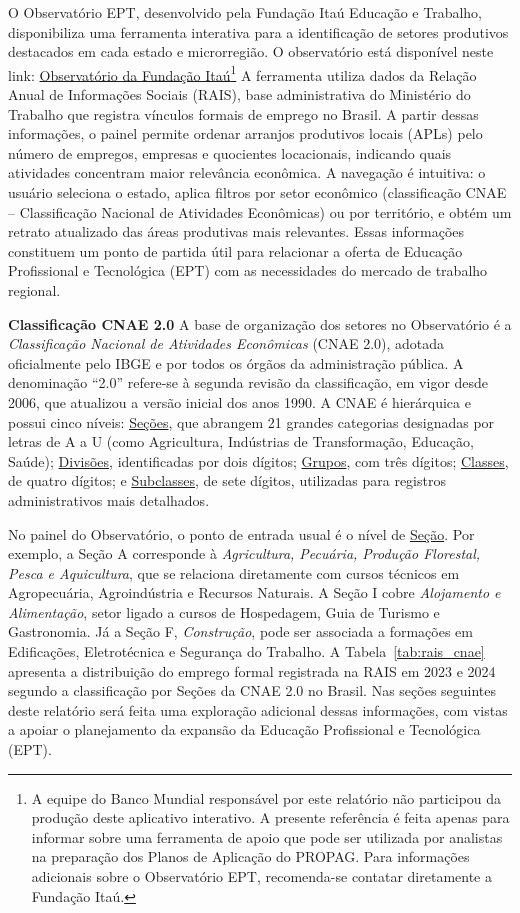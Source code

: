 O Observatório EPT, desenvolvido pela Fundação Itaú Educação e Trabalho, 
disponibiliza uma ferramenta interativa para a identificação de setores produtivos 
destacados em cada estado e microrregião. O observatório está disponível neste link:  
\href{https://observatorioitau.org.br/}{Observatório da Fundação Itaú}\footnote{A equipe do Banco Mundial responsável por este relatório não participou da produção 	deste aplicativo interativo. A presente referência é feita apenas para informar sobre 	uma ferramenta de apoio que pode ser utilizada por analistas na preparação dos 	Planos de Aplicação do PROPAG. Para informações adicionais sobre o Observatório EPT, 
recomenda-se contatar diretamente a Fundação Itaú.} A ferramenta utiliza dados da Relação Anual de Informações Sociais (RAIS), base  administrativa do Ministério do Trabalho que registra vínculos formais de emprego 
no Brasil. A partir dessas informações, o painel permite ordenar arranjos produtivos 
locais (APLs) pelo número de empregos, empresas e quocientes locacionais, 
indicando quais atividades concentram maior relevância econômica. A navegação é 
intuitiva: o usuário seleciona o estado, aplica filtros por setor econômico 
(classificação CNAE -- Classificação Nacional de Atividades Econômicas) ou por 
território, e obtém um retrato atualizado das áreas produtivas mais relevantes. Essas 
informações constituem um ponto de partida útil para relacionar a oferta de Educação 
Profissional e Tecnológica (EPT) com as necessidades do mercado de trabalho regional.

\textbf{Classificação CNAE 2.0}  
A base de organização dos setores no Observatório é a \emph{Classificação Nacional 
	de Atividades Econômicas} (CNAE 2.0), adotada oficialmente pelo IBGE e por todos 
os órgãos da administração pública.  A denominação “2.0” refere-se à segunda 
revisão da classificação, em vigor desde 2006, que atualizou a versão inicial dos 
anos 1990. A CNAE é hierárquica e possui cinco níveis: 
\underline{Seções}, que abrangem 21 grandes categorias designadas por letras de A a U 
(como Agricultura, Indústrias de Transformação, Educação, Saúde); 
\underline{Divisões}, identificadas por dois dígitos; 
\underline{Grupos}, com três dígitos; 
\underline{Classes}, de quatro dígitos; e 
\underline{Subclasses}, de sete dígitos, utilizadas para registros administrativos mais 
detalhados.  

No painel do Observatório, o ponto de entrada usual é o nível de \underline{Seção}. Por exemplo, 
a Seção A corresponde à \emph{Agricultura, Pecuária, Produção Florestal, Pesca e 
	Aquicultura}, que se relaciona diretamente com cursos técnicos em Agropecuária, 
Agroindústria e Recursos Naturais. A Seção I cobre \emph{Alojamento e Alimentação}, 
setor ligado a cursos de Hospedagem, Guia de Turismo e Gastronomia. Já a Seção F, 
\emph{Construção}, pode ser associada a formações em Edificações, Eletrotécnica e 
Segurança do Trabalho. A Tabela~\ref{tab:rais_cnae} apresenta a distribuição do emprego formal registrada na 
RAIS em 2023 e 2024 segundo a classificação por Seções da CNAE 2.0 no Brasil. 
Nas seções seguintes deste relatório será feita uma exploração adicional dessas 
informações, com vistas a apoiar o planejamento da expansão da Educação 
Profissional e Tecnológica (EPT).

